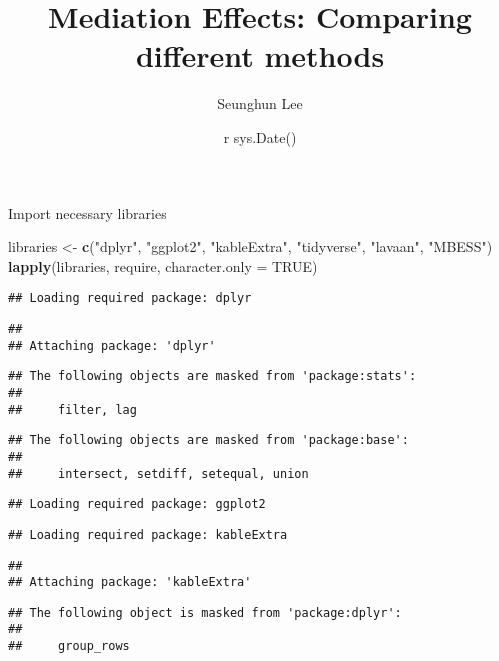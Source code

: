 \documentclass[
]{article}
\title{Mediation Effects: Comparing different methods}
\author{Seunghun Lee}
\date{r sys.Date()}
\newenvironment{Shaded}{\begin{snugshade}}{\end{snugshade}}
\newcommand{\DataTypeTok}[1]{\textcolor[rgb]{0.13,0.29,0.53}{#1}}
\newcommand{\KeywordTok}[1]{\textcolor[rgb]{0.13,0.29,0.53}{\textbf{#1}}}
\newcommand{\NormalTok}[1]{#1}
\newcommand{\OtherTok}[1]{\textcolor[rgb]{0.56,0.35,0.01}{#1}}
\newcommand{\StringTok}[1]{\textcolor[rgb]{0.31,0.60,0.02}{#1}}
\begin{document}
\maketitle

Import necessary libraries

\begin{Shaded}
\begin{Highlighting}[]
\NormalTok{libraries <-}\StringTok{ }\KeywordTok{c}\NormalTok{(}\StringTok{"dplyr"}\NormalTok{, }\StringTok{"ggplot2"}\NormalTok{, }\StringTok{"kableExtra"}\NormalTok{, }\StringTok{"tidyverse"}\NormalTok{, }\StringTok{"lavaan"}\NormalTok{, }\StringTok{"MBESS"}\NormalTok{)}
\KeywordTok{lapply}\NormalTok{(libraries, require, }\DataTypeTok{character.only =} \OtherTok{TRUE}\NormalTok{)}
\end{Highlighting}
\end{Shaded}

\begin{verbatim}
## Loading required package: dplyr
\end{verbatim}

\begin{verbatim}
## 
## Attaching package: 'dplyr'
\end{verbatim}

\begin{verbatim}
## The following objects are masked from 'package:stats':
## 
##     filter, lag
\end{verbatim}

\begin{verbatim}
## The following objects are masked from 'package:base':
## 
##     intersect, setdiff, setequal, union
\end{verbatim}

\begin{verbatim}
## Loading required package: ggplot2
\end{verbatim}

\begin{verbatim}
## Loading required package: kableExtra
\end{verbatim}

\begin{verbatim}
## 
## Attaching package: 'kableExtra'
\end{verbatim}

\begin{verbatim}
## The following object is masked from 'package:dplyr':
## 
##     group_rows
\end{verbatim}
\end{document}
